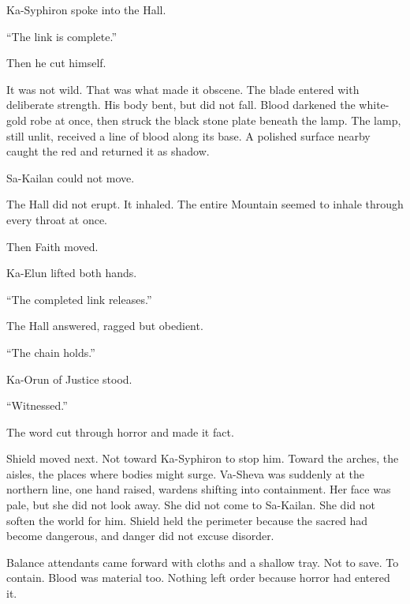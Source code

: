 Ka-Syphiron spoke into the Hall.\par

“The link is complete.”\par

Then he cut himself.\par

It was not wild. That was what made it obscene. The blade entered with deliberate strength. His body bent, but did not fall. Blood darkened the white-gold robe at once, then struck the black stone plate beneath the lamp. The lamp, still unlit, received a line of blood along its base. A polished surface nearby caught the red and returned it as shadow.\par

Sa-Kailan could not move.\par

The Hall did not erupt. It inhaled. The entire Mountain seemed to inhale through every throat at once.\par

Then Faith moved.\par

Ka-Elun lifted both hands.\par

“The completed link releases.”\par

The Hall answered, ragged but obedient.\par

“The chain holds.”\par

Ka-Orun of Justice stood.\par

“Witnessed.”\par

The word cut through horror and made it fact.\par

Shield moved next. Not toward Ka-Syphiron to stop him. Toward the arches, the aisles, the places where bodies might surge. Va-Sheva was suddenly at the northern line, one hand raised, wardens shifting into containment. Her face was pale, but she did not look away. She did not come to Sa-Kailan. She did not soften the world for him. Shield held the perimeter because the sacred had become dangerous, and danger did not excuse disorder.\par

Balance attendants came forward with cloths and a shallow tray. Not to save. To contain. Blood was material too. Nothing left order because horror had entered it.\par

